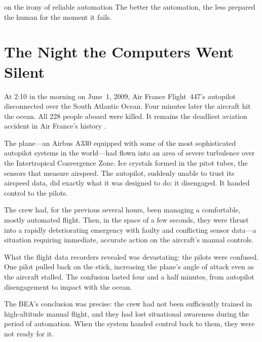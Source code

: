 
\label{chap:ch13}
\begin{chapterquote}{on the irony of reliable automation}
The better the automation, the less prepared the human for the moment it fails.
\end{chapterquote}

\section{The Night the Computers Went Silent}

At 2:10 in the morning on June~1, 2009, Air France Flight~447's autopilot disconnected over the South Atlantic Ocean. Four minutes later the aircraft hit the ocean. All 228 people aboard were killed. It remains the deadliest aviation accident in Air France's history \autocite{bea2012af447}.

The plane---an Airbus A330 equipped with some of the most sophisticated autopilot systems in the world---had flown into an area of severe turbulence over the Intertropical Convergence Zone. Ice crystals formed in the pitot tubes, the sensors that measure airspeed. The autopilot, suddenly unable to trust its airspeed data, did exactly what it was designed to do: it disengaged. It handed control to the pilots.

The crew had, for the previous several hours, been managing a comfortable, mostly automated flight. Then, in the space of a few seconds, they were thrust into a rapidly deteriorating emergency with faulty and conflicting sensor data---a situation requiring immediate, accurate action on the aircraft's manual controls.

What the flight data recorders revealed was devastating: the pilots were confused. One pilot pulled back on the stick, increasing the plane's angle of attack even as the aircraft stalled. The confusion lasted four and a half minutes, from autopilot disengagement to impact with the ocean.

The BEA's conclusion was precise: the crew had not been sufficiently trained in high-altitude manual flight, and they had lost situational awareness during the period of automation. When the system handed control back to them, they were not ready for it.

